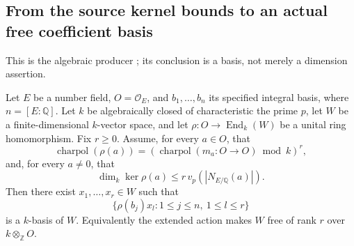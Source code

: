 \subsection{From the source kernel bounds to an actual free coefficient basis}
\label{subsec:faithful-kernel-norm-free}

This is the algebraic producer
; its conclusion is a basis, not
merely a dimension assertion.

\begin{srproposition}\label{prop:faithful-kernel-norm-free}
Let \(E\) be a number field, \(O=\mathcal O_E\), and
\(b_1,\ldots,b_n\) its specified integral basis, where
\(n=[E:\mathbb Q]\).  Let \(k\) be algebraically closed of
characteristic the prime \(p\), let \(W\) be a finite-dimensional
\(k\)-vector space, and let
\(\rho:O\to\operatorname{End}_k(W)\) be a unital ring homomorphism.
Fix \(r\ge0\).  Assume, for every \(a\in O\), that
\[
 \operatorname{charpol}(\rho(a))
  =\left(\operatorname{charpol}(m_a:O\to O)
                                \bmod k\right)^r,
 \tag{NF1}\label{eq:faithful-norm-free-charpoly}
\]
and, for every \(a\ne0\), that
\[
       \dim_k\ker\rho(a)\le
                       r\,v_p(|N_{E/\mathbb Q}(a)|).
 \tag{NF2}\label{eq:faithful-norm-free-kernel}
\]
Then there exist \(x_1,\ldots,x_r\in W\) such that
\[
        \{\rho(b_j)x_l:1\le j\le n,\ 1\le l\le r\}
 \tag{NF3}\label{eq:faithful-norm-free-basis}
\]
is a \(k\)-basis of \(W\).  Equivalently the extended action makes
\(W\) free of rank \(r\) over \(k\otimes_{\mathbb Z}O\).
\end{srproposition}

